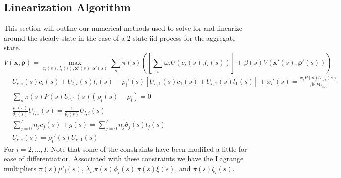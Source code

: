\documentclass[thmsb,11pt]{article}
\begin{document}
\subsection{Linearization Algorithm}\label{apndx: numerical methods}
This section will outline our numerical methods used to solve for and linearize around the steady state in the case of a 2 state iid process for the aggregate state.
\begin{equation}
	V(\bm x,\bm \rho) = \max_{c_i(s),l_i(s),\bm x'(s),\bm\rho'(s)} \sum_s \pi(s)\left(\left[\sum_i \omega_i U(c_i(s),l_i(s))\right] + \beta(s) V(\bm x'(s),\bm \rho'(s))\right)\label{eq.obj}
\end{equation}
\begin{subequations}
\begin{align}
	&U_{c,i}(s)c_i(s)+U_{l,i}(s)l_i(s) - \rho_i'(s)\left[U_{c,1}(s)c_1(s)+U_{l,1}(s)l_1(s)\right]+ x_i'(s) = \frac{x_i P(s) U_{c,i}(s)}{\beta \mathbb{E} P U_{c,i}}\label{eq.imp_con}\\
	&\sum_s \pi(s) P(s)U_{c,1}(s)(\rho_i(s) -\rho_i) = 0\\
	&\frac{\rho'(s)}{\theta_1(s)}U_{l,1}(s) = \frac{1}{\theta_i(s)}U_{l,i}(s)\\
	& \sum_{j=0}^In_j c_j(s)  + g(s) = \sum_{j=0}^{I} n_j\theta_j(s)l_j(s)\\
	& U_{c,i}(s) = \rho_i'(s) U_{c,1}(s)\label{eq.rho_con}
\end{align}\end{subequations}  For $i=2,\ldots,I$.  Note that some of the constraints have been modified a little for ease of differentiation.  Associated with these constraints we have the Lagrange multipliers $\pi(s)\mu'_i(s)$, $\lambda_i$,$\pi(s)\phi_i(s)$,$\pi(s)\xi(s)$, and $\pi(s)\zeta_i(s)$.
\end{document}

